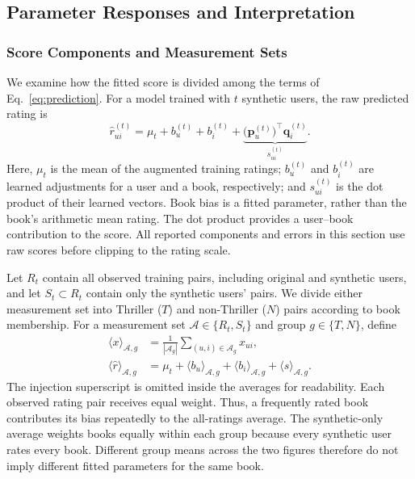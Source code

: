 \documentclass[information,article,submit,pdftex,moreauthors]{Definitions/mdpi}
\begin{document}
\subsection{Parameter Responses and Interpretation}
\label{sec:bi-mechanism}

\subsubsection{Score Components and Measurement Sets}

We examine how the fitted score is divided among the terms of Eq.~\eqref{eq:prediction}. For a model trained with $t$ synthetic users, the raw predicted rating is
\begin{equation}
\label{eq:training_score_components}
\hat r_{ui}^{(t)}=\mu_t+b_u^{(t)}+b_i^{(t)}+
\underbrace{\bigl(\mathbf p_u^{(t)}\bigr)^\top\mathbf q_i^{(t)}}_{s_{ui}^{(t)}}.
\end{equation}
Here, $\mu_t$ is the mean of the augmented training ratings; $b_u^{(t)}$ and $b_i^{(t)}$ are learned adjustments for a user and a book, respectively; and $s_{ui}^{(t)}$ is the dot product of their learned vectors. Book bias is a fitted parameter, rather than the book's arithmetic mean rating. The dot product provides a user--book contribution to the score. All reported components and errors in this section use raw scores before clipping to the rating scale.

Let $R_t$ contain all observed training pairs, including original and synthetic users, and let $S_t\subset R_t$ contain only the synthetic users' pairs. We divide either measurement set into Thriller ($T$) and non-Thriller ($N$) pairs according to book membership. For a measurement set $\mathcal A\in\{R_t,S_t\}$ and group $g\in\{T,N\}$, define
\begin{equation}
\label{eq:training_component_average}
\begin{aligned}
\langle x\rangle_{\mathcal A,g}
&=\frac{1}{|\mathcal A_g|}\sum_{(u,i)\in\mathcal A_g}x_{ui},\\
\langle\hat r\rangle_{\mathcal A,g}
&=\mu_t+\langle b_u\rangle_{\mathcal A,g}
+\langle b_i\rangle_{\mathcal A,g}+\langle s\rangle_{\mathcal A,g}.
\end{aligned}
\end{equation}
The injection superscript is omitted inside the averages for readability. Each observed rating pair receives equal weight. Thus, a frequently rated book contributes its bias repeatedly to the all-ratings average. The synthetic-only average weights books equally within each group because every synthetic user rates every book. Different group means across the two figures therefore do not imply different fitted parameters for the same book.
\end{document}
